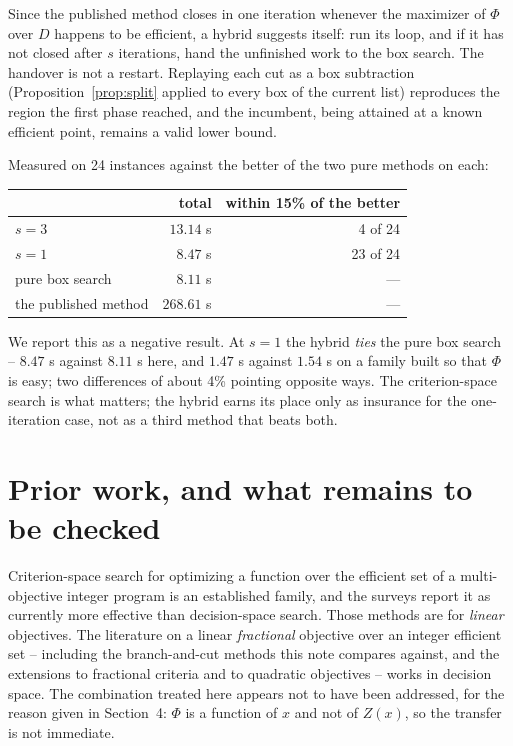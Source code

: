 \documentclass[11pt,a4paper]{article}
\newcommand{\Z}{Z}
\newcommand{\Dset}{D}
\begin{document}
Since the published method closes in one iteration whenever the maximizer of
$\Phi$ over $\Dset$ happens to be efficient, a hybrid suggests itself: run its
loop, and if it has not closed after $s$ iterations, hand the unfinished work
to the box search. The handover is not a restart. Replaying each cut as a box
subtraction (Proposition~\ref{prop:split} applied to every box of the current
list) reproduces the region the first phase reached, and the incumbent, being
attained at a known efficient point, remains a valid lower bound.

Measured on 24 instances against the better of the two pure methods on each:

\begin{table}[h]
\centering
\begin{tabular}{lrr}
\toprule
 & total & within 15\% of the better \\
\midrule
$s = 3$              & $13.14$ s  & 4 of 24 \\
$s = 1$              & $8.47$ s   & 23 of 24 \\
pure box search      & $8.11$ s   & --- \\
the published method & $268.61$ s & --- \\
\bottomrule
\end{tabular}
\end{table}

\noindent
We report this as a negative result. At $s = 1$ the hybrid \emph{ties} the pure
box search -- $8.47$ s against $8.11$ s here, and $1.47$ s against $1.54$ s on
a family built so that $\Phi$ is easy; two differences of about 4\% pointing
opposite ways. The criterion-space search is what matters; the hybrid earns its
place only as insurance for the one-iteration case, not as a third method that
beats both.

\section{Prior work, and what remains to be checked}

Criterion-space search for optimizing a function over the efficient set of a
multi-objective integer program is an established family, and the surveys
report it as currently more effective than decision-space search. Those
methods are for \emph{linear} objectives. The literature on a linear
\emph{fractional} objective over an integer efficient set -- including the
branch-and-cut methods this note compares against, and the extensions to
fractional criteria and to quadratic objectives -- works in decision space.
The combination treated here appears not to have been addressed, for the
reason given in Section~4: $\Phi$ is a function of $x$ and not of $\Z(x)$, so
the transfer is not immediate.
\end{document}
